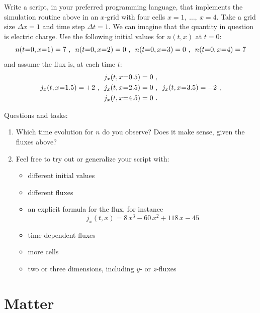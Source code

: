 \documentclass[a4paper,12pt,%
onecolumn,oneside,titlepage,%
british%
]{memoir}
\newcommand*{\incr}{\Delta}%
\renewcommand*{\|}[1][]{\nonscript\:#1\vert\nonscript\:\mathopen{}}
\newcommand*{\mo}[1][=]{\mathclose{}\mathord{\nonscript\mkern0.5mu#1\nonscript\mkern0.5mu}\mathopen{}}
\newcommand*{\Dt}{\incr t}
\newcommand*{\Dx}{\incr x}
\begin{document}
\begin{exercise}
  Write a script, in your preferred programming language, that implements the simulation routine above in an $x$-grid with four cells $x=1,\ \dotsc,\ x=4$. Take a grid size $\Dx=1$ and time step $\Dt=1$. We can imagine that the quantity in question is electric charge. Use the following initial values for $n(t,x)$ at $t=0$:
  \begin{equation*}
    n(t\mo0, x\mo1)=7\ ,\enspace
    n(t\mo0, x\mo2)=0\ ,\enspace
    n(t\mo0, x\mo3)=0\ ,\enspace
    n(t\mo0, x\mo4)=7
  \end{equation*}
  and assume the flux is, at each time $t$:
  \begin{multline*}
      j_{x}(t, x\mo0.5)=0\ ,\\
      j_{x}(t, x\mo1.5)=+2\ ,\enspace
      j_{x}(t, x\mo2.5)=0\ ,\enspace
      j_{x}(t, x\mo3.5)=-2\ ,\\
      j_{x}(t, x\mo4.5)=0 \ .
    \end{multline*}

    Questions and tasks:
    \begin{enumerate}[shif,label={\bfseries\arabic*.}]
    \item Which time evolution for $n$ do you observe? Does it make sense, given the fluxes above?
    \item Feel free to try out or generalize your script with:
      \begin{itemize}[shift]
      \item different initial values
      \item different fluxes
      \item an explicit formula for the flux, for instance
        \begin{equation*}
          j_{x}(t,x) = 8\,x^{3} - 60\,x^{2} + 118\,x - 45
        \end{equation*}
      \item time-dependent fluxes
      \item more cells
      \item two or three dimensions, including $y$- or $z$-fluxes
      \end{itemize}
    \end{enumerate}

\end{exercise}



\printpagenotes*
\clearpage
\chapter{Matter}
\label{cha:matter}
\end{document}
